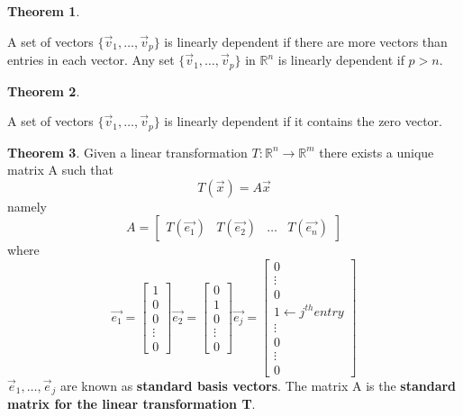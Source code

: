 \documentclass[a4paper,12pt]{article}
\theoremstyle{definition}
\newtheorem{theorem}{Theorem}
\theoremstyle{definition}
\newcommand{\finitevecs}[2]{#1_1,\ldots,#1_#2}
\newcommand{\finitevecsset}[2]{\{\finitevecs{#1}{#2}\}}
\begin{document}
	\begin{theorem}
		\label{thm:lin-dep-thm-p-gt-n}
		
		A set of vectors $\finitevecsset{\vec{v}}{p}$ is linearly dependent if there are more vectors than entries in each vector. Any set $\finitevecsset{\vec{v}}{p}$ in $\mathbb{R}^n$ is linearly dependent if $p > n$.
	\end{theorem}
	
	\begin{theorem}
		\label{thm:lin-dep-thm-zero-vec}
		
		A set of vectors $\finitevecsset{\vec{v}}{p}$ is linearly dependent if it contains the zero vector.
	\end{theorem}
	
	\begin{theorem}
		\label{thm:lin-trans-unique-mat-thm}
		Given a linear transformation $T: \mathbb{R}^n \rightarrow \mathbb{R}^m$ there exists a unique matrix A such that
		\begin{equation*}
			T(\vec{x}) = A\vec{x}
		\end{equation*}
		namely
		\begin{equation*}
			A =
			\begin{bmatrix}
				T(\vec{e_1}) & T(\vec{e_2}) & \ldots & T(\vec{e_n})
			\end{bmatrix}
		\end{equation*}
		where
		\begin{equation*}
			\vec{e_1} =
			\begin{bmatrix}
				1\\
				0\\
				0\\
				\vdots\\
				0
			\end{bmatrix}
			\vec{e_2} =
			\begin{bmatrix}
				0\\
				1\\
				0\\
				\vdots\\
				0
			\end{bmatrix}
			\vec{e_j} =
			\begin{bmatrix}
				0\\
				\vdots\\
				0\\
				1 \leftarrow j^{th} entry\\
				\vdots\\
				0\\
				\vdots\\
				0
			\end{bmatrix}
		\end{equation*}
		$\finitevecs{\vec{e}}{j}$ are known as \textbf{standard basis vectors}. The matrix A is the \textbf{standard matrix for the linear transformation T}.
	\end{theorem}
	
\end{document}
